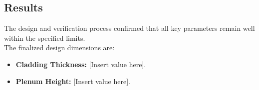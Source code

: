 \subsection{Results}

The design and verification process confirmed that all key parameters remain well within the specified limits. \\
The finalized design dimensions are:
\begin{itemize}
    \item \textbf{Cladding Thickness:} [Insert value here].
    \item \textbf{Plenum Height:} [Insert value here].
\end{itemize}
